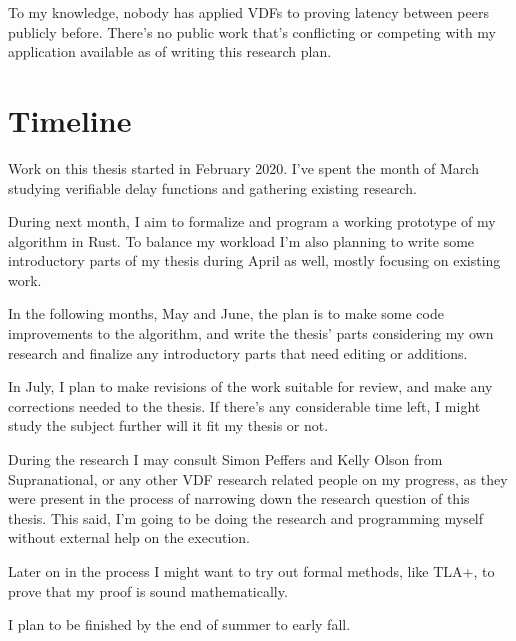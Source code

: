 \documentclass[a4paper,12pt]{article}
\begin{document}
To my knowledge, nobody has applied VDFs to proving latency between peers publicly before. There's no public work that's conflicting or competing with my application available as of writing this research plan.

\section{Timeline}
Work on this thesis started in February 2020. I've spent the month of March studying verifiable delay functions and gathering existing research.

During next month, I aim to formalize and program a working prototype of my algorithm in Rust. To balance my workload I'm also planning to write some introductory parts of my thesis during April as well, mostly focusing on existing work.

In the following months, May and June, the plan is to make some code improvements to the algorithm, and write the thesis' parts considering my own research and finalize any introductory parts that need editing or additions.

In July, I plan to make revisions of the work suitable for review, and make any corrections needed to the thesis. If there's any considerable time left, I might study the subject further will it fit my thesis or not.

During the research I may consult Simon Peffers and Kelly Olson from Supranational, or any other VDF research related people on my progress, as they were present in the process of narrowing down the research question of this thesis. This said, I'm going to be doing the research and programming myself without external help on the execution.

Later on in the process I might want to try out formal methods, like TLA+, to prove that my proof is sound mathematically.

I plan to be finished by the end of summer to early fall.



\end{document}

